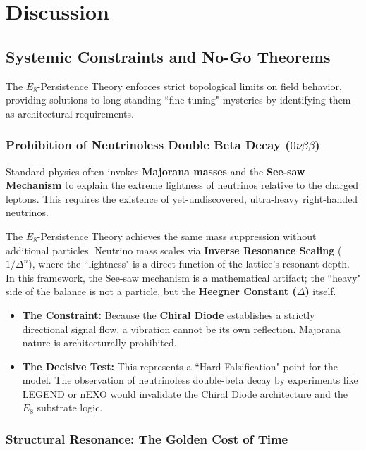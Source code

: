 \section{Discussion}

\subsection{Systemic Constraints and No-Go Theorems}

The $E_8$-Persistence Theory enforces strict topological limits on field behavior, providing solutions to long-standing ``fine-tuning" mysteries by identifying them as architectural requirements.

\subsubsection{Prohibition of Neutrinoless Double Beta Decay (\texorpdfstring{$0\nu\beta\beta$}{0nubetabeta})}

Standard physics often invokes \textbf{Majorana masses} and the \textbf{See-saw Mechanism} to explain the extreme lightness of neutrinos relative to the charged leptons. This requires the existence of yet-undiscovered, ultra-heavy right-handed neutrinos.

The $E_8$-Persistence Theory achieves the same mass suppression without additional particles. Neutrino mass scales via \textbf{Inverse Resonance Scaling} ($1/\Delta^n$), where the ``lightness" is a direct function of the lattice's resonant depth. In this framework, the See-saw mechanism is a mathematical artifact; the ``heavy" side of the balance is not a particle, but the \textbf{Heegner Constant ($\Delta$)} itself.

\begin{itemize}
    \item \textbf{The Constraint:} Because the \textbf{Chiral Diode} establishes a strictly directional signal flow, a vibration cannot be its own reflection. Majorana nature is architecturally prohibited.
    \item \textbf{The Decisive Test:} This represents a ``Hard Falsification" point for the model. The observation of neutrinoless double-beta decay by experiments like LEGEND or nEXO would invalidate the Chiral Diode architecture and the $E_8$ substrate logic.
\end{itemize}

\subsubsection{Structural Resonance: The Golden Cost of Time}

